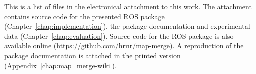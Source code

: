 \label{chap:files}

This is a list of files in the electronical attachment to this work. The attachment contains source code for the presented \gls{ROS} package (Chapter~\ref{chap:implementation}), the package documentation and experimental data (Chapter~\ref{chap:evaluation}). Source code for the \gls{ROS} package is also available online (\url{https://github.com/hrnr/map-merge}). A reproduction of the package documentation is attached in the printed version (Appendix~\ref{chap:map_merge-wiki}).

\medskip

